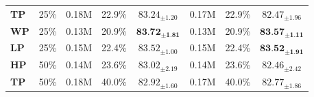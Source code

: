 \documentclass[letterpaper]{article} %
\begin{document}
\begin{table}[!t]
{\begin{tabular}{@{}l|c|ccc|ccc@{}}
\text{\Large \textcolor{myred}{$\bullet$}} \textbf{TP}                  & 25\%                                          & 0.18M                                             & 22.9\%                                                                         &   $83.24_{ \pm 1.20}$   & 0.17M                                            &  22.9\%                                                                     &    $82.47_{ \pm 1.96}$                                            \\
\text{\Large \textcolor{mygreen}{$\bullet$}} \textbf{WP}                   & 25\%                                          & 0.13M                                              & 20.9\%                                                                        &     $\textbf{83.72}_{ \pm \textbf{1.81}}$       & 0.13M                                             & 20.9\%                                                                        &  $\textbf{83.57}_{ \pm \textbf{1.11}}$                                   \\
\text{\Large\textcolor{myorange}{$\bullet$}} \textbf{LP}                   & 25\%                                          & 0.15M                                             & 22.4\%                                                                        &          $83.52_{ \pm 1.00}$   & 0.15M                                           &   22.4\%                                                                      & $\textbf{83.52}_{ \pm \textbf{1.91}}$                                    \\ \midrule
\text{\Large\textcolor{myblue}{$\bullet$}} \textbf{HP}                   & 50\%                                          &  0.14M                                            & 23.6\%                                                       &   $83.02_{ \pm 2.19}$   & 0.14M                                             &  23.6\%                                                                      & $82.46_{ \pm 2.42}$                                        \\
\text{\Large \textcolor{myred}{$\bullet$}} \textbf{TP}                   & 50\%                                          &  0.18M                                            & 40.0\%                                                                       &         $82.92_{ \pm 1.60}$ & 0.17M                                             &   40.0\%                                                                     &   $82.77_{ \pm 1.86}$                                                                           \\

\end{tabular}}
\end{table}
\end{document}
